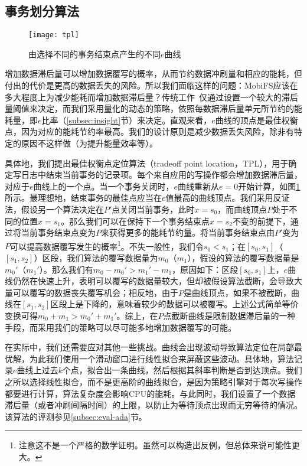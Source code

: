 \subsection{事务划分算法}
\label{subsec:point}

\begin{figure}
\centering
\texttt{[image: tpl]}
\caption{由选择不同的事务结束点产生的不同$e$曲线}
\label{fig:tpl}
\end{figure}

增加数据滞后量可以增加数据覆写的概率，从而节约数据冲刷量和相应的能耗，但付出的代价是更高的数据丢失的风险。所以我们面临这样的问题：MobiFS应该在多大程度上为减少能耗而增加数据滞后量？传统工作~\cite{Ma:2011:LPF:1989323.1989325, Mickens:2014:BFC:2616448.2616473, Ports:2010:TCA:1924943.1924963}仅通过设置一个较大的滞后量阈值来决定，而我们采用量化的动态的策略，依照每数据滞后量单元所节约的能耗量，即$e$比率（\ref{subsec:insight}节）来决定。直观来看，$e$曲线的顶点是最佳权衡点，因为对应的能耗节约率最高。我们的设计原则是减少数据丢失风险，除非有特定的原因不这样做（为提升能量效率等）。 

具体地，我们提出最佳权衡点定位算法（tradeoff point location，TPL），用于确定写日志中结束当前事务的记录项。每个来自应用的写操作都会增加数据滞后量，对应于$e$曲线上的一个点。当一个事务关闭时，$e$曲线重新从$e=0$开始计算，如图\ref{fig:tpl}所示。最理想地，结束事务的最佳点应当在$e$值最高的曲线顶点。我们采用反证法，假设另一个算法决定在$P'$点关闭当前事务，此时$x = s_0$，而曲线顶点$P$处于不同的位置$x = s_1$。那么我们可以在保持下一个事务结束点$x = s_2$不变的前提下，通过将当前事务结束点变为$P$来获得更多的能耗节约量。将当前事务结束点由$P'$变为$P$可以提高数据覆写发生的概率\footnote{注意这不是一个严格的数学证明。虽然可以构造出反例，但总体来说可能性更大。}。不失一般性，我们令$s_0 < s_1$；在$[s_0, s_1]$（$[s_1, s_2]$）区段，我们算法的覆写数据量为$m_0$（$m_1$），假设的算法的覆写数据量是$m_0'$（$m_1'$）。那么我们有$m_0 - m_0' > m_1' -
m_1$，原因如下：区段$[s_0, s_1]$上，$e$曲线仍然在快速上升，表明可以覆写的数据量较大，但却被假设算法截断，会导致大量可以覆写的数据丧失覆写机会；相反地，由于$P$是曲线顶点，如果不被截断，曲线在$[s_1, s_2]$区段上是下降的，意味着较少的数据可以被覆写。上述公式简单等价变换可得$m_0 + m_1 > m_0' + m_1'$。综上，在$P$点截断曲线是限制数据滞后量的一种手段，而采用我们的策略可以尽可能多地增加数据覆写的可能。
 
在实际中，我们还需要应对其他一些挑战。曲线会出现波动导致算法定位在局部最优解，为此我们使用一个滑动窗口进行线性拟合来屏蔽这些波动。具体地，算法记录$e$曲线上过去$k$个点，拟合出一条曲线，然后根据其斜率判断是否到达顶点。我们之所以选择线性拟合，而不是更高阶的曲线拟合，是因为策略引擎对于每次写操作都要进行计算，算法复杂度会影响CPU的能耗。与此同时，我们设置了一个数据滞后量（或者冲刷间隔时间）的上限，以防止为等待顶点出现而无穷等待的情况。该算法的评测参见\ref{subsec:eval-ada}节。

